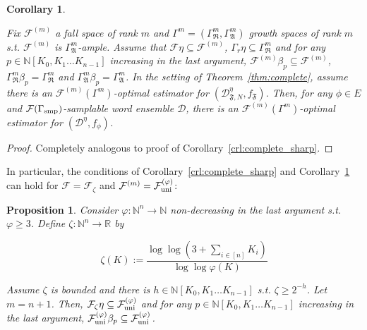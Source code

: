 \documentclass{article}
\numberwithin{equation}{section}
\theoremstyle{definition}
\theoremstyle{plain}
\newtheorem{proposition}{Proposition}[section]
\newtheorem{corollary}{Corollary}[section]
\newcommand{\Nats}{\mathbb{N}}
\newcommand{\Reals}{\mathbb{R}}
\newcommand{\NatPoly}{\Nats[K_0, K_1 \ldots K_{n-1}]}
\newcommand{\Dist}{\mathcal{D}}
\newcommand{\GrowR}{\Gamma_{\mathfrak{R}}}
\newcommand{\GrowA}{\Gamma_{\mathfrak{A}}}
\newcommand{\Fall}{\mathcal{F}}
\newcommand{\FallUt}[1]{{\Fall_{\textnormal{uni}}^{(#1)}}}
\begin{document}
\begin{samepage}
\begin{corollary}
\label{crl:complete}

Fix ${\Fall^{(m)}}$ a fall space of rank ${m}$ and ${\Gamma^m=(\GrowR^m, \GrowA^m)}$ growth spaces of rank ${m}$ s.t. ${\Fall^{(m)}}$ is ${\GrowA^m}$-ample. Assume that ${\Fall \eta \subseteq \Fall^{(m)}}$, ${\Gamma_r \eta \subseteq \GrowR^{m}}$ and for any ${p \in \NatPoly}$ increasing in the last argument, ${\Fall^{(m)} \beta_p \subseteq \Fall^{(m)}}$, ${\GrowR^m \beta_p = \GrowR^m}$ and ${\GrowA^m \beta_p = \GrowA^m}$. In the setting of Theorem~\ref{thm:complete}, assume there is an ${\Fall^{(m)}(\Gamma^m)}$-optimal estimator for ${(\Dist_{\mathfrak{F},N}^\eta,f_{\mathfrak{F}})}$. Then, for any ${\phi \in E}$ and ${\Fall(\Gamma_{\textnormal{smp}})}$-samplable word ensemble ${\Dist}$, there is an ${\Fall^{(m)}(\Gamma^m)}$-optimal estimator for ${(\Dist^\eta,f_\phi)}$.
\end{corollary}
\end{samepage}

\begin{proof}

Completely analogous to proof of Corollary~\ref{crl:complete_sharp}.
%
\end{proof}

In particular, the conditions of Corollary~\ref{crl:complete_sharp} and Corollary~\ref{crl:complete} can hold for ${\Fall=\Fall_\zeta}$ and ${\Fall^{(m)}=\FallUt{\varphi}}$:

\begin{samepage}
\begin{proposition}

Consider ${\varphi: \Nats^n \rightarrow \Nats}$ non-decreasing in the last argument s.t. ${\varphi \geq 3}$. Define ${\zeta: \Nats^n \rightarrow \Reals}$ by

\begin{equation}
\zeta(K):=\frac{\log \log (3+\sum_{i \in [n]} K_i)}{\log \log \varphi(K)}
\end{equation}

Assume ${\zeta}$ is bounded and there is ${h \in \NatPoly}$ s.t. ${\zeta \geq 2^{-h}}$. Let ${m = n + 1}$. Then, ${\Fall_\zeta \eta \subseteq \FallUt{\varphi}}$ and for any ${p \in \NatPoly}$ increasing in the last argument, ${\FallUt{\varphi} \beta_p \subseteq \FallUt{\varphi}}$.

\end{proposition}
\end{samepage}
\end{document}
